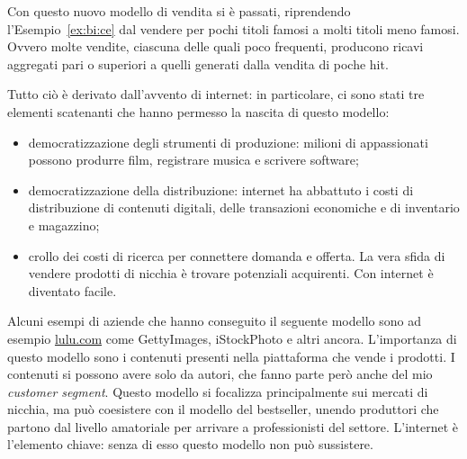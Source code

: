 Con questo nuovo modello di vendita si è passati, riprendendo
l'Esempio~\ref{ex:bi:ce} dal vendere per pochi titoli famosi a molti titoli
meno famosi. Ovvero molte vendite, ciascuna delle quali poco frequenti,
producono ricavi aggregati pari o superiori a quelli generati dalla vendita di
poche hit.

Tutto ciò è derivato dall'avvento di internet: in particolare, ci sono stati
tre elementi scatenanti che hanno permesso la nascita di questo modello:
\begin{itemize}
 \item democratizzazione degli strumenti di produzione: milioni di appassionati
possono produrre film, registrare musica e scrivere software;
 \item democratizzazione della distribuzione: internet ha abbattuto i costi di
distribuzione di contenuti digitali, delle transazioni economiche e di
inventario e magazzino;
 \item crollo dei costi di ricerca per connettere domanda e offerta. La vera
sfida di vendere prodotti di nicchia è trovare potenziali acquirenti. Con
internet è diventato facile.
\end{itemize}

Alcuni esempi di aziende che hanno conseguito il seguente modello sono ad
esempio \url{lulu.com} come GettyImages, iStockPhoto e altri ancora.
L'importanza di questo modello sono i contenuti presenti nella piattaforma che
vende i prodotti. I contenuti si possono avere solo da autori, che fanno parte
però anche del mio \textit{customer segment}. Questo modello si focalizza
principalmente sui mercati di nicchia, ma può coesistere con il modello del
bestseller, unendo produttori che partono dal livello amatoriale per arrivare a
professionisti del settore. L'internet è l'elemento chiave: senza di esso
questo modello non può sussistere.


